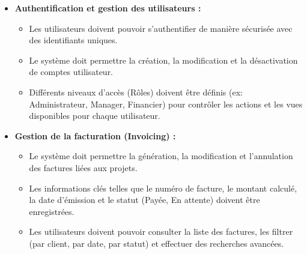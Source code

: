 \documentclass[12pt, a4paper, openany]{report}
\begin{document}
\begin{itemize}
    
    \renewcommand{\labelitemi}{\textcolor{primaryBlue}{\textbf{\large \ding{118}}}} 
    \setlength{\itemsep}{0.5cm} 

    \item \textcolor{primaryBlue}{\textbf{Authentification et gestion des utilisateurs :}}
    \begin{itemize}
       
        \renewcommand{\labelitemii}{\textcolor{royalBlue}{\textbullet}}
        \setlength{\itemsep}{0.2cm}
        \vspace{0.2cm}
        
        \vspace{-0.3cm}
        \item Les utilisateurs doivent pouvoir s'authentifier de manière sécurisée avec des identifiants uniques.
        \vspace{-0.3cm}
        \item Le système doit permettre la création, la modification et la désactivation de comptes utilisateur.
        \vspace{-0.3cm}
        \item Différents niveaux d'accès (Rôles) doivent être définis (ex: Administrateur, Manager, Financier) pour contrôler les actions et les vues disponibles pour chaque utilisateur.
    \end{itemize}

    \vspace{-0.4cm}
    \item \textcolor{primaryBlue}{\textbf{Gestion de la facturation (Invoicing) :}}
    \begin{itemize}
        \renewcommand{\labelitemii}{\textcolor{royalBlue}{\textbullet}}
        \setlength{\itemsep}{0.2cm}
        \vspace{0.2cm}
        
        \vspace{-0.3cm}
        \item Le système doit permettre la génération, la modification et l'annulation des factures liées aux projets.
        \vspace{-0.3cm}
        \item Les informations clés telles que le numéro de facture, le montant calculé, la date d'émission et le statut (Payée, En attente) doivent être enregistrées.
        \vspace{-0.3cm}
        \item Les utilisateurs doivent pouvoir consulter la liste des factures, les filtrer (par client, par date, par statut) et effectuer des recherches avancées.
    \end{itemize}


\end{itemize}
\end{document}
